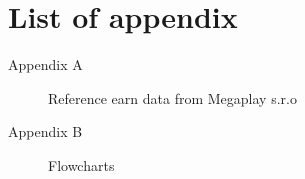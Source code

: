 
\chapter*{List of appendix}

\begin{description}
	\item[Appendix A] Reference earn data from Megaplay s.r.o
	\item[Appendix B] Flowcharts
\end{description}
